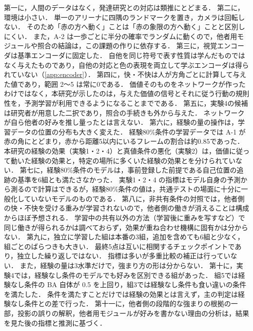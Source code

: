 第一に，人間のデータはなく，発達研究との対応は類推にとどまる．
第二に，環境は小さい．
単一のアリーナに四隅のランドマークを置き，カメラは回転しない．
そのため「赤の方へ動く」ことは「赤の象限の方へ動く」ことと区別しにくい．
また，A-2 は一歩ごとに半分の確率でランダムに動くので，他者用モジュールや照合の結論は，この課題の作りに依存する．
第三に，視覚エンコーダは基準エンコーダに固定した．
自他を同じ符号で表す性質は学んだものではなく与えたものであり，自他の対応と色の表現を両立して学ぶエンコーダは得られていない（\ref{app:encoder}）．
第四に，快・不快は人が方角ごとに計算して与えた値であり，範囲 2〜5 は常に0である．
価値そのものをネットワークが作ったわけではなく，本研究が示したのは，与えた価値の信号とそれに従う行動の規則性を，予測学習が利用できるようになることまでである．
第五に，実験4の候補は研究者が用意した二択であり，照合の手続きも外から与えた．
ネットワークが自ら他者の好みを推し量ったとは言えない．
第六に，経験の量の操作は，学習データの位置の分布も大きく変えた．
経験80\%条件の学習データでは A-1 が赤の角にとどまり，赤から距離5以内にいるフレームの割合は約0.85であった．
本研究の経験の効果（実験1・2・4）と真値条件の悪化（実験2）は，価値に従って動いた経験の効果と，特定の場所に多くいた経験の効果とを分けられていない．
第七に，経験80\%条件のモデルは，事前登録した前提である自己位置の追跡の基準を6組とも満たさなかった．
実験1・2・4 の指標はモデル自身の予測から測るので計算はできるが，経験80\%条件の値は，共通テストの場面に十分に一般化していないモデルのものである．
第八に，非共有条件の対照では，他者側の快・不快を受ける重みが学習されないので，他者側の働きが消えることは構成からほぼ予想される．
学習中の共有以外の方法（学習後に重みを写すなど）で同じ働きが得られるかは調べておらず，効果が重ね合わせ機構に固有かは分からない．
第九に，独立に学習した組は本番の3組，追加を含めても6組と少なく，組ごとのばらつきも大きい．
最終5点は互いに相関するチェックポイントであり，独立した繰り返しではない．
指標は多いが多重比較の補正は行っていない．
また，経験の量は3水準だけで，強まり方の形は分からない．
第十に，実験4では，経験なし条件のモデルでも好みを区別できる組があった．
組5では経験なし条件の BA 自体が 0.5 を上回り，組3では経験なし条件も食い違いの条件を満たした．
条件を満たすことだけでは経験の効果とは言えず，主の判定は経験なし条件との差で行った．
第十一に，他者側の段階的な強まりの根拠の一部，投影の誤りの解釈，他者用モジュールが好みを書かない理由の分析は，結果を見た後の指標と推測に基づく．

